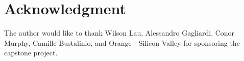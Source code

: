 \documentclass[12pt,journal]{IEEEtran}
\begin{document}
\section*{Acknowledgment}


The author would like to thank Wilson Lau, Alessandro Gagliardi, Conor Murphy, Camille Bustalinio, and Orange - Silicon Valley for sponsoring the capstone project.


\ifCLASSOPTIONcaptionsoff
  \newpage
\fi

\newpage



\end{document}
